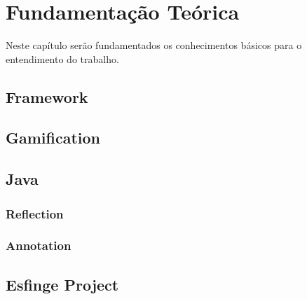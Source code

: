 \chapter{Fundamentação Teórica}
\label{ch:fundamentacao}
\par Neste capítulo ser\~ao fundamentados os conhecimentos b\'asicos para o entendimento do trabalho.
\section{Framework}

\section{Gamification}

\section{Java}

\subsection{Reflection}

\subsection{Annotation}

\section{Esfinge Project}